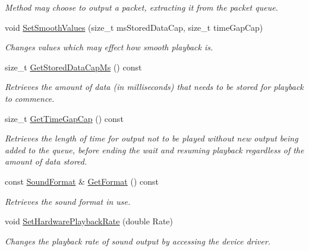 \begin{DoxyCompactItemize}
\begin{DoxyCompactList}\small\item\em Method may choose to output a packet, extracting it from the packet queue. \item\end{DoxyCompactList}\item 
void \hyperlink{class_sound_instance_output_adfbfdd24496614e867f59488ba30ff68}{SetSmoothValues} (size\_\-t msStoredDataCap, size\_\-t timeGapCap)
\begin{DoxyCompactList}\small\item\em Changes values which may effect how smooth playback is. \item\end{DoxyCompactList}\item 
size\_\-t \hyperlink{class_sound_instance_output_ae353aa0ab31d014a92837f1e73ac9431}{GetStoredDataCapMs} () const 
\begin{DoxyCompactList}\small\item\em Retrieves the amount of data (in milliseconds) that needs to be stored for playback to commence. \item\end{DoxyCompactList}\item 
size\_\-t \hyperlink{class_sound_instance_output_ac4b1b8ff9d46a64870217045b0e1e130}{GetTimeGapCap} () const 
\begin{DoxyCompactList}\small\item\em Retrieves the length of time for output not to be played without new output being added to the queue, before ending the wait and resuming playback regardless of the amount of data stored. \item\end{DoxyCompactList}\item 
const \hyperlink{class_sound_format}{SoundFormat} \& \hyperlink{class_sound_instance_output_a31aa9bf9f48cccc959a3a8d5816a8591}{GetFormat} () const 
\begin{DoxyCompactList}\small\item\em Retrieves the sound format in use. \item\end{DoxyCompactList}\item 
void \hyperlink{class_sound_instance_output_a97f2472e5d45949d6982c5a122f7c1bc}{SetHardwarePlaybackRate} (double Rate)
\begin{DoxyCompactList}\small\item\em Changes the playback rate of sound output by accessing the device driver. \item\end{DoxyCompactList}\item 

\end{DoxyCompactItemize}
